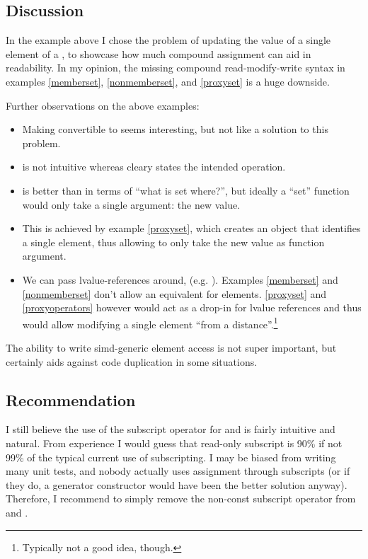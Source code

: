 \subsection{Discussion}
In the example above I chose the problem of updating the value of a single
element of a \simd, to showcase how much compound assignment can aid in
readability.
In my opinion, the missing compound read-modify-write syntax in examples
\ref{memberset}, \ref{nonmemberset}, and \ref{proxyset} is a huge downside.

Further observations on the above examples:
\begin{itemize}
  \item Making  convertible to  seems interesting, but
    not like a solution to this problem.

  \item {} is not intuitive whereas  cleary
    states the intended operation.

  \item {} is better than  in terms of “what
    is set where?”, but ideally a “set” function would only take a single
    argument: the new value.

  \item This is achieved by example \ref{proxyset}, which creates an object
    that identifies a single element, thus allowing  to only take the
    new value as function argument.

  \item We can pass lvalue-references around, (e.g. ).
    Examples \ref{memberset} and \ref{nonmemberset} don't allow an equivalent
    for \simd elements.
    \ref{proxyset} and \ref{proxyoperators} however would act as a drop-in for
    lvalue references and thus would allow modifying a single \simd element
    “from a distance”.\footnote{Typically not a good idea, though.}
\end{itemize}

The ability to write simd-generic element access is not super important, but
certainly aids against code duplication in some situations.


\subsection{Recommendation}
I still believe the use of the subscript operator for \simd and \mask is fairly
intuitive and natural.
From experience I would guess that read-only subscript is 90\% if not 99\% of
the typical current use of subscripting.
I may be biased from writing many unit tests, and nobody actually uses
assignment through subscripts (or if they do, a generator constructor would
have been the better solution anyway).
Therefore, I recommend to simply remove the non-const subscript operator from
\simd and \mask.

